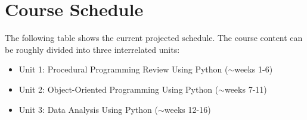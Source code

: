 \documentclass[11pt]{article}
\begin{document}
\section{Course Schedule}
The following table shows the current projected schedule. The course content can be roughly divided into three interrelated units:

\begin{itemize}
	\item Unit 1: Procedural Programming Review Using Python ($\sim$weeks 1-6)
	\item Unit 2: Object-Oriented Programming Using Python ($\sim$weeks 7-11)
	\item Unit 3: Data Analysis Using Python ($\sim$weeks 12-16)
\end{itemize}

\end{document}
